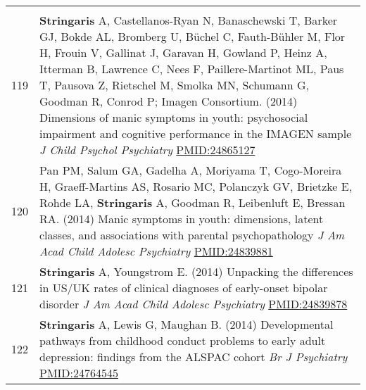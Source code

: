 \documentclass[
]{article}
\begin{document}
\begin{longtable}[]{@{}ll@{}}
\begin{minipage}[t]{0.94\columnwidth}
\end{minipage}\tabularnewline
\begin{minipage}[t]{0.01\columnwidth}\raggedright
119\strut
\end{minipage} & \begin{minipage}[t]{0.94\columnwidth}\raggedright
\textbf{Stringaris} A, Castellanos-Ryan N, Banaschewski T, Barker GJ,
Bokde AL, Bromberg U, Büchel C, Fauth-Bühler M, Flor H, Frouin V,
Gallinat J, Garavan H, Gowland P, Heinz A, Itterman B, Lawrence C, Nees
F, Paillere-Martinot ML, Paus T, Pausova Z, Rietschel M, Smolka MN,
Schumann G, Goodman R, Conrod P; Imagen Consortium. (2014) Dimensions of
manic symptoms in youth: psychosocial impairment and cognitive
performance in the IMAGEN sample \emph{J Child Psychol Psychiatry}
\url{PMID:24865127}\strut
\end{minipage}\tabularnewline
\begin{minipage}[t]{0.01\columnwidth}\raggedright
120\strut
\end{minipage} & \begin{minipage}[t]{0.94\columnwidth}\raggedright
Pan PM, Salum GA, Gadelha A, Moriyama T, Cogo-Moreira H, Graeff-Martins
AS, Rosario MC, Polanczyk GV, Brietzke E, Rohde LA, \textbf{Stringaris}
A, Goodman R, Leibenluft E, Bressan RA. (2014) Manic symptoms in youth:
dimensions, latent classes, and associations with parental
psychopathology \emph{J Am Acad Child Adolesc Psychiatry}
\url{PMID:24839881}\strut
\end{minipage}\tabularnewline
\begin{minipage}[t]{0.01\columnwidth}\raggedright
121\strut
\end{minipage} & \begin{minipage}[t]{0.94\columnwidth}\raggedright
\textbf{Stringaris} A, Youngstrom E. (2014) Unpacking the differences in
US/UK rates of clinical diagnoses of early-onset bipolar disorder
\emph{J Am Acad Child Adolesc Psychiatry} \url{PMID:24839878}\strut
\end{minipage}\tabularnewline
\begin{minipage}[t]{0.01\columnwidth}\raggedright
122\strut
\end{minipage} & \begin{minipage}[t]{0.94\columnwidth}\raggedright
\textbf{Stringaris} A, Lewis G, Maughan B. (2014) Developmental pathways
from childhood conduct problems to early adult depression: findings from
the ALSPAC cohort \emph{Br J Psychiatry} \url{PMID:24764545}\strut
\end{minipage}\tabularnewline

\end{longtable}
\end{document}
